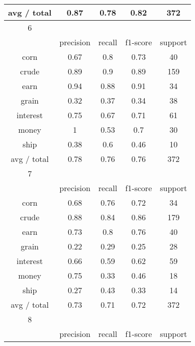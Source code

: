 \documentclass[11pt]{article}
\begin{document}
\begin{center}
\begin{longtable}{| c | c | c | c | c |}
avg / total & 0.87      & 0.78   & 0.82     & 372     \\
\hline

6           &           &        &          &         \\
\hline
           & precision & recall & f1-score & support \\

corn        & 0.67      & 0.8    & 0.73     & 40      \\
crude       & 0.89      & 0.9    & 0.89     & 159     \\
earn        & 0.94      & 0.88   & 0.91     & 34      \\
grain       & 0.32      & 0.37   & 0.34     & 38      \\
interest    & 0.75      & 0.67   & 0.71     & 61      \\
money       & 1         & 0.53   & 0.7      & 30      \\
ship        & 0.38      & 0.6    & 0.46     & 10      \\

avg / total & 0.78      & 0.76   & 0.76     & 372     \\
\hline

7           &           &        &          &         \\
\hline
           & precision & recall & f1-score & support \\

corn        & 0.68      & 0.76   & 0.72     & 34      \\
crude       & 0.88      & 0.84   & 0.86     & 179     \\
earn        & 0.73      & 0.8    & 0.76     & 40      \\
grain       & 0.22      & 0.29   & 0.25     & 28      \\
interest    & 0.66      & 0.59   & 0.62     & 59      \\
money       & 0.75      & 0.33   & 0.46     & 18      \\
ship        & 0.27      & 0.43   & 0.33     & 14      \\

avg / total & 0.73      & 0.71   & 0.72     & 372     \\
\hline

8           &           &        &          &         \\
\hline
           & precision & recall & f1-score & support \\


\end{longtable}
\end{center}
\end{document}
